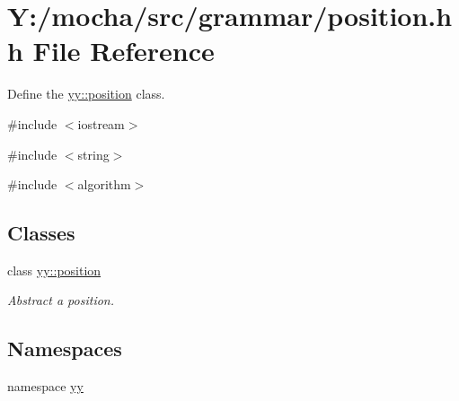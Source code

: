 \hypertarget{position_8hh}{
\section{Y:/mocha/src/grammar/position.hh File Reference}
\label{position_8hh}
}


Define the \hyperlink{classyy_1_1position}{yy::position} class.  


{\ttfamily \#include $<$iostream$>$}\par
{\ttfamily \#include $<$string$>$}\par
{\ttfamily \#include $<$algorithm$>$}\par
\subsection*{Classes}
\begin{DoxyCompactItemize}
\item 
class \hyperlink{classyy_1_1position}{yy::position}
\begin{DoxyCompactList}\small\item\em Abstract a position. \end{DoxyCompactList}\end{DoxyCompactItemize}
\subsection*{Namespaces}
\begin{DoxyCompactItemize}
\item 
namespace \hyperlink{namespaceyy}{yy}
\end{DoxyCompactItemize}
